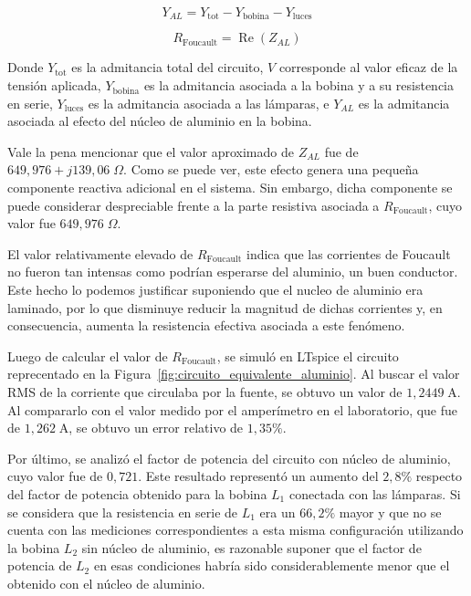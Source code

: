 \begin{equation}
Y_{AL}=Y_{\text{tot}}-Y_{\text{bobina}}-Y_{\text{luces}}
\label{eq:YAL}
\end{equation}

\begin{equation}
R_{\text{Foucault}}=\operatorname{Re}(Z_{AL})
\label{eq:RFoucault}
\end{equation}


Donde \(Y_{\text{tot}}\) es la admitancia total del circuito, \(V\) corresponde al valor eficaz de la tensión aplicada, \(Y_{\text{bobina}}\) es la admitancia asociada a la bobina y a su resistencia en serie, \(Y_{\text{luces}}\) es la admitancia asociada a las lámparas, e \(Y_{AL}\) es la admitancia asociada al efecto del núcleo de aluminio en la bobina.

Vale la pena mencionar que el valor aproximado de \(Z_{AL}\) fue de $649{,}976+j139{,}06 \; \Omega$. Como se puede ver, este efecto genera una pequeña componente reactiva adicional en el sistema. Sin embargo, dicha componente se puede considerar despreciable frente a la parte resistiva asociada a \(R_{\text{Foucault}}\), cuyo valor fue $649{,}976 \; \Omega$.

El valor relativamente elevado de \(R_{\text{Foucault}}\) indica que las corrientes de Foucault no fueron tan intensas como podrían esperarse del aluminio, un buen conductor. Este hecho lo podemos justificar suponiendo que el nucleo de aluminio era laminado, por lo que disminuye reducir la magnitud de dichas corrientes y, en consecuencia, aumenta la resistencia efectiva asociada a este fenómeno.


Luego de calcular el valor de \(R_{\text{Foucault}}\), se simuló en LTspice el circuito reprecentado en la Figura~\ref{fig:circuito_equivalente_aluminio}. Al buscar el valor RMS de la corriente que circulaba por la fuente, se obtuvo un valor de \(1{,}2449 \; \mathrm{A}\). Al compararlo con el valor medido por el amperímetro en el laboratorio, que fue de \(1{,}262 \; \mathrm{A}\), se obtuvo un error relativo de \(1{,}35\%\).

Por último, se analizó el factor de potencia del circuito con núcleo de aluminio, cuyo valor fue de \(0{,}721\). Este resultado representó un aumento del \(2{,}8\%\) respecto del factor de potencia obtenido para la bobina \(L_1\) conectada con las lámparas. Si se considera que la resistencia en serie de \(L_1\) era un \(66{,}2\%\) mayor y que no se cuenta con las mediciones correspondientes a esta misma configuración utilizando la bobina \(L_2\) sin núcleo de aluminio, es razonable suponer que el factor de potencia de \(L_2\) en esas condiciones habría sido considerablemente menor que el obtenido con el núcleo de aluminio.

